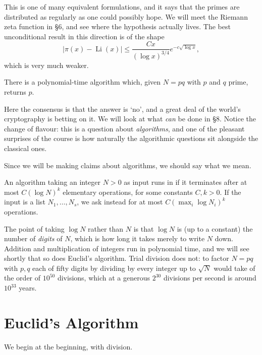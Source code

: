 \documentclass[a4paper]{scrartcl}
\DeclareMathOperator{\Li}{Li}
\begin{document}
This is one of many equivalent formulations, and it says that the primes are distributed as regularly as one could possibly hope. We will meet the Riemann zeta function in \S6, and see where the hypothesis actually lives. The best unconditional result in this direction is of the shape
$$
|\pi(x) - \Li(x)| \leq \frac{Cx}{(\log x)^{3/4}} e^{-c \sqrt{\log x}},
$$
which is very much weaker.

\begin{conjecture}
	There is a polynomial-time algorithm which, given $N = pq$ with $p$ and $q$ prime, returns $p$.
\end{conjecture}

Here the consensus is that the answer is `no', and a great deal of the world's cryptography is betting on it. We will look at what \emph{can} be done in \S8. Notice the change of flavour: this is a question about \emph{algorithms}, and one of the pleasant surprises of the course is how naturally the algorithmic questions sit alongside the classical ones.

Since we will be making claims about algorithms, we should say what we mean.

\begin{definition}
	An algorithm taking an integer $N > 0$ as input runs in  if it terminates after at most $C(\log N)^k$ elementary operations, for some constants $C, k > 0$. If the input is a list $N_1, \dots, N_s$, we ask instead for at most $C(\max_i \log N_i)^k$ operations.
\end{definition}

The point of taking $\log N$ rather than $N$ is that $\log N$ is (up to a constant) the number of \emph{digits} of $N$, which is how long it takes merely to write $N$ down. Addition and multiplication of integers run in polynomial time, and we will see shortly that so does Euclid's algorithm. Trial division does not: to factor $N = pq$ with $p, q$ each of fifty digits by dividing by every integer up to $\sqrt{N}$ would take of the order of $10^{50}$ divisions, which at a generous $2^{30}$ divisions per second is around $10^{33}$ years.

\section{Euclid's Algorithm}

We begin at the beginning, with division.
\end{document}
